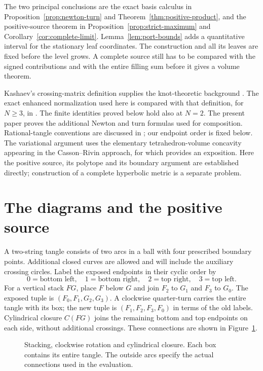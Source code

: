 \documentclass[11pt]{article}
\numberwithin{equation}{section}
\theoremstyle{definition}\newtheorem{definition}[theorem]{Definition}
\theoremstyle{remark}\newtheorem{remark}[theorem]{Remark}
\begin{document}
The two principal conclusions are the exact basis calculus in
Proposition~\ref{prop:newton-turn} and Theorem~\ref{thm:positive-product},
and the positive-source theorem in Proposition~\ref{prop:strict-maximum}
and Corollary~\ref{cor:complete-limit}. Lemma~\ref{lem:port-bounds}
adds a quantitative interval for the stationary leaf coordinates.
The construction and all its leaves are fixed before the level grows.
A complete source still has to be compared with the signed contributions
and with the entire filling sum before it gives a volume theorem.

Kashaev's crossing-matrix definition supplies the knot-theoretic
background \cite{Kashaev1995}. The exact enhanced normalization used
here is compared with that definition, for $N\ge3$, in
\cite[Theorem~10.1]{Finite}. The finite identities proved below hold
also at $N=2$.
The present paper proves the additional Newton and turn formulas used
for composition. Rational-tangle conventions are discussed in
\cite{KauffmanLambropoulou}; our endpoint order is fixed below.
The variational argument uses the elementary tetrahedron-volume
concavity appearing in the Casson--Rivin approach, for which
\cite{FuterGueritaud} provides an exposition. Here the positive source,
its polytope and its boundary argument are established directly;
construction of a complete hyperbolic metric is a separate problem.

\section{The diagrams and the positive source}\label{nt:diagrams}
A two-string tangle consists of two arcs in a ball with four prescribed
boundary points. Additional closed curves are allowed and will include
the auxiliary crossing circles. Label the exposed endpoints in their
cyclic order by
\[
0=\text{bottom left},\quad1=\text{bottom right},\quad
2=\text{top right},\quad3=\text{top left}.
\]
For a vertical stack $FG$, place $F$ below $G$ and join $F_2$ to $G_1$
and $F_3$ to $G_0$. The exposed tuple is $(F_0,F_1,G_2,G_3)$.
A clockwise quarter-turn carries the entire tangle with its box; the
new tuple is $(F_1,F_2,F_3,F_0)$ in terms of the old labels.
Cylindrical closure $C(FG)$ joins the remaining bottom and top endpoints
on each side, without additional crossings. These connections are shown
in Figure~\ref{nt:operations}.

\begin{figure}[ht]
\centering
\caption{Stacking, clockwise rotation and cylindrical closure. Each box
contains its entire tangle. The outside arcs specify the actual
connections used in the evaluation.}\label{nt:operations}
\end{figure}
\end{document}
